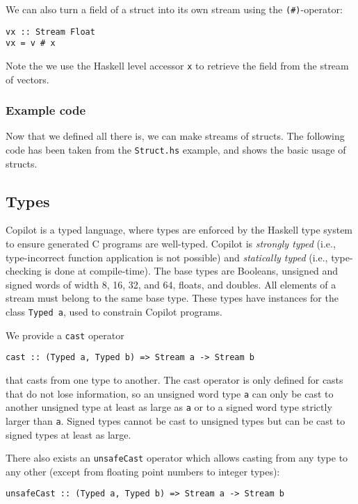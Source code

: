 We can also turn a field of a struct into its own stream using the
\texttt{(\#)}-operator:
\begin{lstlisting}[language=Copilot]
vx :: Stream Float
vx = v # x
\end{lstlisting}
Note the we use the Haskell level accessor \texttt{x} to retrieve the field
from the stream of vectors.


\subsubsection*{Example code}
\label{exm:struct}
Now that we defined all there is, we can make streams of structs. The following
code has been taken from the \texttt{Struct.hs} example, and shows the basic
usage of structs.
%

%

\subsection{Types} \label{sec:types}

Copilot is a typed language, where types are enforced by the Haskell type system
to ensure generated C programs are well-typed.  Copilot is \emph{strongly typed}
(i.e., type-incorrect function application is not possible) and \emph{statically
  typed} (i.e., type-checking is done at compile-time).  The base types are
Booleans, unsigned and signed words of width 8, 16, 32, and 64, floats, and
doubles.  All elements of a stream must belong to the same base
type.  These types have instances for the class {\tt Typed a}, used to constrain
Copilot programs.

We provide a {\tt cast} operator
%
\begin{lstlisting}[language = Copilot, frame = single]
cast :: (Typed a, Typed b) => Stream a -> Stream b
\end{lstlisting}
%
that casts from one type to another.  The cast operator is only defined for
casts that do not lose information, so an unsigned word type {\tt a} can only be
cast to another unsigned  type at least as large as {\tt a} or to a signed word
type strictly larger than {\tt a}.  Signed types cannot be cast to unsigned
types but can be cast to signed types at least as large.

There also exists an {\tt unsafeCast} operator which allows casting from any
type to any other (except from floating point numbers to integer types):

\begin{lstlisting}[language = Copilot, frame = single]
unsafeCast :: (Typed a, Typed b) => Stream a -> Stream b
\end{lstlisting}

